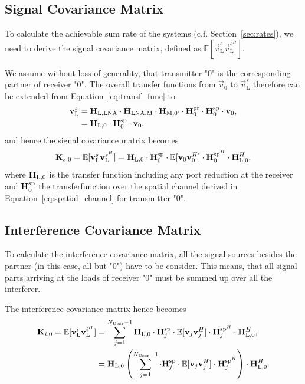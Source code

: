 \subsection{Signal Covariance Matrix}
\label{sec:sig_cov}
To calculate the achievable sum rate of the systems (c.f. Section~\ref{sec:rates}), we need to derive the signal covariance matrix, defined as $\mathbb{E}[\vec{v}_\text{L}^s\vec{v}_\text{L}^{s^H}]$.

We assume without loss of generality, that transmitter "0" is the corresponding partner of receiver "0".
The overall transfer functions from $\vec{v}_0$ to $\vec{v}_\text{L}^s$ therefore can be extended from Equation~\eqref{eq:transf_func} to
\begin{align}
\label{eq:transfer_function}
 \mathbf{v}_\text{L}^s&= \mathbf{H}_\text{L,LNA}\cdot\mathbf{H}_\text{LNA,M}\cdot\mathbf{H}_\text{M,0'}
		\cdot \mathbf{H}_0^{\text{pr}}\cdot\mathbf{H}_{0}^{\text{sp}} \cdot\mathbf{v}_0,\\\nonumber
 &=\mathbf{H}_\text{L,0}\cdot \mathbf{H}_{0}^{\text{sp}}\cdot\mathbf{v}_0,
\end{align}
and hence the signal covariance matrix becomes
\begin{equation}
\label{eq:sig_cov}
\mathbf{K}_{s,0}=\mathbb{E}[\mathbf{v}_\text{L}^s\mathbf{v}_\text{L}^{s^H}] = 
	\mathbf{H}_\text{L,0}\cdot \mathbf{H}_{0}^{\text{sp}}
	\cdot\mathbb{E}[\mathbf{v}_0\mathbf{v}_0^H]\cdot
	\mathbf{H}_{0}^{\text{sp}^H} \cdot \mathbf{H}_\text{L,0}^H,
\end{equation}
where $\mathbf{H}_\text{L,0}$ is the transfer function including any port reduction at the receiver and $\mathbf{H}_{0}^{\text{sp}}$ the transferfunction over the spatial channel derived in Equation~\eqref{eq:spatial_channel} for transmitter "0".

\subsection{Interference Covariance Matrix}
\label{sec:int_cov}

To calculate the interference covariance matrix, all the signal sources besides the partner (in this case, all but "0") have to be consider.
This means, that all signal parts arriving at the loads of receiver "0" must be summed up over all the interferer.

The interference covariance matrix hence becomes 
\begin{align}
\label{eq:interf_cov}\nonumber
\mathbf{K}_{i,0}=\mathbb{E}[\mathbf{v}_\text{L}^i\mathbf{v}_\text{L}^{i^H}] &= \sum_{j=1}^{N_\text{User}-1} 
	\mathbf{H}_\text{L,0} \cdot \mathbf{H}_{j}^{\text{sp}} \cdot 
	\mathbb{E}[\mathbf{v}_{j}\mathbf{v}_{j}^H] \cdot 
	\mathbf{H}_{j}^{\text{sp}^H} \cdot \mathbf{H}_\text{L,0}^H,\\
	&= \mathbf{H}_\text{L,0} \left(\sum_{j=1}^{N_\text{User}-1} 
	\cdot \mathbf{H}_{j}^{\text{sp}} \cdot 
	\mathbb{E}[\mathbf{v}_{j}\mathbf{v}_{j}^H] \cdot 
	\mathbf{H}_{j}^{\text{sp}^H}\right) \cdot \mathbf{H}_\text{L,0}^H.
\end{align}


